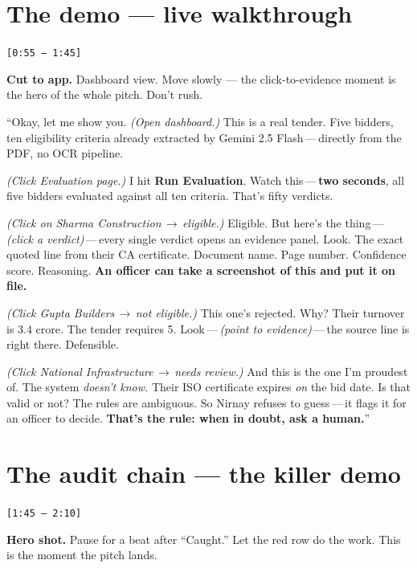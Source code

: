 \documentclass[11pt,a4paper]{article}
\newcommand{\ts}[1]{{\small\color{accent}\texttt{[#1]}}}
\begin{document}
\section{The demo --- live walkthrough}
\ts{0:55 -- 1:45}

\begin{cue}
\textbf{Cut to app.} Dashboard view. Move slowly --- the click-to-evidence moment is the hero of the whole pitch. Don't rush.
\end{cue}

\begin{spoken}
``Okay, let me show you. \emph{(Open dashboard.)} This is a real tender. Five bidders, ten eligibility criteria already extracted by Gemini 2.5 Flash\,---\,directly from the PDF, no OCR pipeline.

\smallskip
\emph{(Click Evaluation page.)} I hit \textbf{Run Evaluation}. Watch this\,---\,\textbf{two seconds}, all five bidders evaluated against all ten criteria. That's fifty verdicts.

\smallskip
\emph{(Click on Sharma Construction\,$\rightarrow$\,eligible.)} Eligible. But here's the thing\,---\,\emph{(click a verdict)}\,---\,every single verdict opens an evidence panel. Look. The exact quoted line from their CA certificate. Document name. Page number. Confidence score. Reasoning. \textbf{An officer can take a screenshot of this and put it on file.}

\smallskip
\emph{(Click Gupta Builders\,$\rightarrow$\,not eligible.)} This one's rejected. Why? Their turnover is 3.4 crore. The tender requires 5. Look\,---\,\emph{(point to evidence)}\,---\,the source line is right there. Defensible.

\smallskip
\emph{(Click National Infrastructure\,$\rightarrow$\,needs review.)} And this is the one I'm proudest of. The system \emph{doesn't know.} Their ISO certificate expires \emph{on} the bid date. Is that valid or not? The rules are ambiguous. So Nirnay refuses to guess\,---\,it flags it for an officer to decide. \textbf{That's the rule: when in doubt, ask a human.}''
\end{spoken}

\section{The audit chain --- the killer demo}
\ts{1:45 -- 2:10}

\begin{cue}
\textbf{Hero shot.} Pause for a beat after ``Caught.'' Let the red row do the work. This is the moment the pitch lands.
\end{cue}
\end{document}
